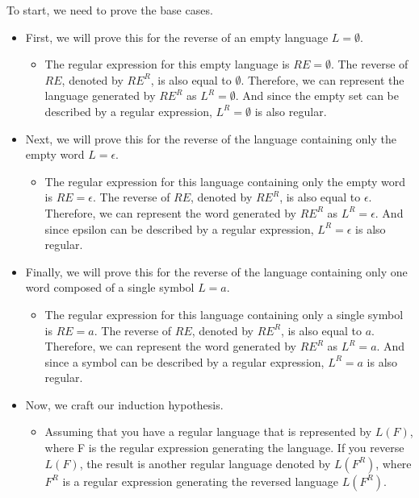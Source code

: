 \documentclass[12pt]{article}
\newenvironment{solution}[1][{\color{red} Solution:}]{\begin{trivlist}
\item[\hskip \labelsep {\bfseries #1}\hskip \labelsep {\bfseries}]}{\end{trivlist}}
\begin{document}
\begin{solution}
 \item To start, we need to prove the base cases. 
     \begin{itemize}[label=]
     \item First, we will prove this for the reverse of an empty language $L = \emptyset$. 
        \begin{itemize}[label=]
        \item The regular expression for this empty language is $RE = \emptyset$. The reverse of  $RE$, denoted by $RE^R$, is also equal to $\emptyset$. Therefore, we can represent the language generated by $RE^R$ as $L^R = \emptyset$. And since the empty set can be described by a regular expression, $L^R = \emptyset$ is also regular. 
        \end{itemize}
     \item Next, we will prove this for the reverse of the language containing only the empty word $L=\epsilon$.
        \begin{itemize}[label=]
        \item The regular expression for this language containing only the empty word is $RE = \epsilon$. The reverse of  $RE$, denoted by $RE^R$, is also equal to $\epsilon$. Therefore, we can represent the word generated by $RE^R$ as $L^R = \epsilon$. And since epsilon can be described by a regular expression, $L^R = \epsilon$ is also regular. 
        \end{itemize}
     \item Finally, we will prove this for the reverse of the language containing only one word composed of a single symbol $L=a$.
     \begin{itemize}[label=]
        \item The regular expression for this language containing only a single symbol is $RE = a$. The reverse of  $RE$, denoted by $RE^R$, is also equal to $a$. Therefore, we can represent the word generated by $RE^R$ as $L^R = a$. And since a symbol can be described by a regular expression, $L^R = a$ is also regular. 
     \end{itemize}
  \item Now, we craft our induction hypothesis. 
  \begin{itemize}[label=]
        \item Assuming that you have a regular language that is represented by $L(F)$, where F is the regular expression generating the language. If you reverse $L(F)$, the result is another regular language denoted by $L(F^R)$, where $F^R$ is a regular expression generating the reversed language $L(F^R)$.
     \end{itemize}


\end{itemize}
\end{solution}
\end{document}
